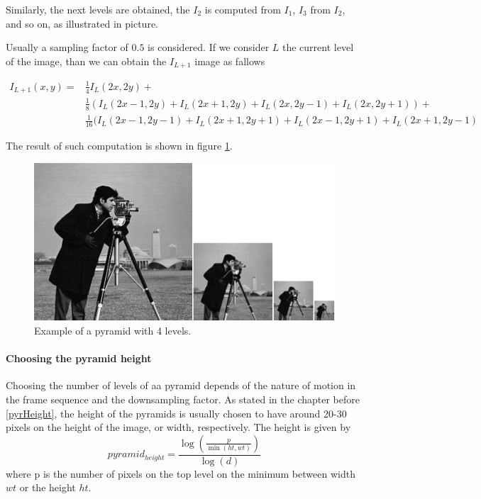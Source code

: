 \documentclass[12pt,a4paper,twoside]{report}
\begin{document}
{Similarly, the next levels are obtained, the $I_2$ is computed from $I_1$, $I_3$ from $I_2$, and so on, as illustrated in picture.

Usually a sampling factor of $0.5$ is considered. If we consider $L$ the current level of the image, than we can obtain the $I_{L+1}$ image as fallows



\begin{equation} \label{eq1}
\begin{split}
I_{L+1}(x,y) = &\frac{1}{4}I_L(2x,2y)+\\
&\frac{1}{8}(I_L(2x-1,2y)+I_L(2x+1,2y)+I_L(2x,2y-1)+I_L(2x,2y+1))+\\
&\frac{1}{16}(I_L(2x-1,2y-1)+I_L(2x+1,2y+1)+I_L(2x-1,2y+1)+I_L(2x+1,2y-1) 
\end{split}
\end{equation}

The result of such computation is shown in figure \ref{cameraPyr}.

\begin{figure}
	\label{cameraPyr}
	\centering
	\includegraphics{img/cameraman}
	\caption{Example of a pyramid with 4 levels.}
\end{figure}


\paragraph{Choosing the pyramid height} 
Choosing the number of levels of aa pyramid depends of the nature of motion in the frame sequence and the downsampling factor.
 As stated in the chapter before \ref{pyrHeight}, the height of the pyramids is usually chosen to have around 20-30 pixels on the height of the image, or width, respectively. The height is given by
\begin{equation} \label{pyrheight}
	pyramid_{height} = \frac{\log\left(\frac{p}{\min(ht,wt)}\right)}
							{\log(d)}
\end{equation}
where p is the number of pixels on the top level on the minimum between  width $wt$ or the height $ht$.
}
\end{document}
